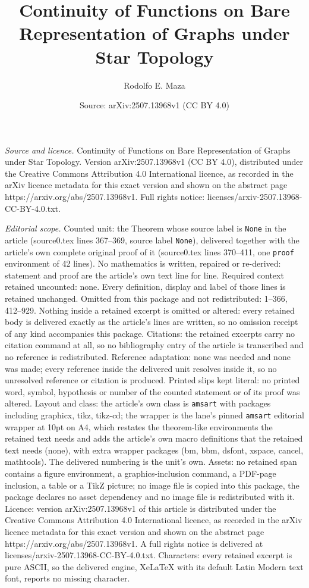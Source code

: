 \documentclass[10pt,a4paper]{amsart}
\title[Continuity of Functions on Bare Representation of Graphs und]{Continuity of Functions on Bare Representation of Graphs under Star Topology}
\author{Rodolfo E. Maza}
\date{Source: arXiv:2507.13968v1 (CC BY 4.0)}
\begin{document}
\maketitle

\noindent\emph{Source and licence.} Continuity of Functions on Bare Representation of Graphs under Star Topology. Version arXiv:2507.13968v1 (CC BY 4.0), distributed under the Creative Commons Attribution 4.0 International licence, as recorded in the arXiv licence metadata for this exact version and shown on the abstract page https://arxiv.org/abs/2507.13968v1. Full rights notice: licenses/arxiv-2507.13968-CC-BY-4.0.txt.\par\smallskip

\noindent\textit{Editorial scope.} Counted unit: the Theorem whose source label is \texttt{None} in the article (source0.tex lines 367--369, source label \texttt{None}), delivered together with the article's own complete original proof of it (source0.tex lines 370--411, one \texttt{proof} environment of 42 lines). No mathematics is written, repaired or re-derived: statement and proof are the article's own text line for line. Required context retained uncounted: none. Every definition, display and label of those lines is retained unchanged. Omitted from this package and not redistributed: 1--366, 412--929. Nothing inside a retained excerpt is omitted or altered: every retained body is delivered exactly as the article's lines are written, so no omission receipt of any kind accompanies this package. Citations: the retained excerpts carry no citation command at all, so no bibliography entry of the article is transcribed and no reference is redistributed. Reference adaptation: none was needed and none was made; every reference inside the delivered unit resolves inside it, so no unresolved reference or citation is produced. Printed slips kept literal: no printed word, symbol, hypothesis or number of the counted statement or of its proof was altered. Layout and class: the article's own class is \texttt{amsart} with packages including graphicx, tikz, tikz-cd; the wrapper is the lane's pinned \texttt{amsart} editorial wrapper at 10pt on A4, which restates the theorem-like environments the retained text needs and adds the article's own macro definitions that the retained text needs (none), with extra wrapper packages (bm, bbm, dsfont, xspace, cancel, mathtools). The delivered numbering is the unit's own. Assets: no retained span contains a figure environment, a graphics-inclusion command, a PDF-page inclusion, a table or a TikZ picture; no image file is copied into this package, the package declares no asset dependency and no image file is redistributed with it. Licence: version arXiv:2507.13968v1 of this article is distributed under the Creative Commons Attribution 4.0 International licence, as recorded in the arXiv licence metadata for this exact version and shown on the abstract page https://arxiv.org/abs/2507.13968v1. A full rights notice is delivered at licenses/arxiv-2507.13968-CC-BY-4.0.txt. Characters: every retained excerpt is pure ASCII, so the delivered engine, XeLaTeX with its default Latin Modern text font, reports no missing character.
\end{document}
